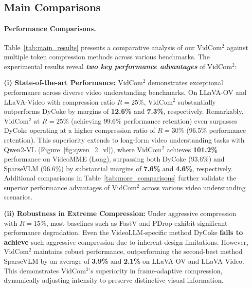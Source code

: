 \subsection{Main Comparisons}
\label{subsec:Comparison}

\paragraph{Performance Comparisons.} 

Table~\ref{tab:main_results} presents a comparative analysis of our VidCom$^2$ against multiple token compression methods across various benchmarks. The experimental results reveal \textbf{\emph{two key performance advantages}} of VidCom$^2$:






\noindent \textbf{(i) State-of-the-art Performance:} VidCom$^2$ demonstrates exceptional performance across diverse video understanding benchmarks. On LLaVA-OV and LLaVA-Video with compression ratio $R=25\%$, VidCom$^2$ substantially outperforms DyCoke by margins of \textbf{12.6\%} and \textbf{7.3\%}, respectively. Remarkably, VidCom$^2$ at $R=25\%$ (achieving 99.6\% performance retention) even surpasses DyCoke operating at a higher compression ratio of $R=30\%$ (96.5\% performance retention). This superiority extends to long-form video understanding tasks with Qwen2-VL (Figure~\ref{fig:qwen_2_vl}), where VidCom$^2$ achieves \textbf{101.2\%} performance on VideoMME (Long), surpassing both DyCoke (93.6\%) and SparseVLM (96.6\%) by substantial margins of \textbf{7.6\%} and \textbf{4.6\%}, respectively. Additional comparisons in Table~\ref{tab:more_comparisons} further validate the superior performance advantages of VidCom$^2$ across various video understanding scenarios.

\noindent \textbf{(ii) Robustness in Extreme Compression:} Under aggressive compression with $R=15\%$, most baselines such as FastV and PDrop exhibit significant performance degradation. Even the VideoLLM-specific method DyCoke \textbf{fails to achieve} such aggressive compression due to inherent design limitations.
However, VidCom$^2$ maintains robust performance, outperforming the second-best method SparseVLM by an average of \textbf{3.9\%} and \textbf{2.1\%} on LLaVA-OV and LLaVA-Video. 
This demonstrates VidCom$^2$'s superiority in frame-adaptive compression, dynamically adjusting intensity to preserve distinctive visual information.

